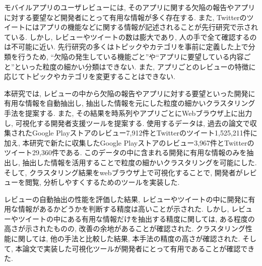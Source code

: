 
モバイルアプリのユーザレビューには, そのアプリに関する欠陥の報告やアプリに対する要望など開発者にとって有用な情報が多く存在する. また, Twitterのツイートにはアプリの機能などに関する情報が記述されることが先行研究で示されている. しかし, レビューやツイートの数は膨大であり, 人の手で全て確認するのは不可能に近い. 
先行研究の多くはトピックやカテゴリを事前に定義した上で分類を行うため, ``欠陥の発生している機能ごと''や``アプリに要望している内容ごと''といった粒度の細かい分類はできない. また, アプリごとのレビューの特徴に応じてトピックやカテゴリを変更することはできない. 

本研究では, レビューの中から欠陥の報告やアプリに対する要望といった開発に有用な情報を自動抽出し, 抽出した情報を元にした粒度の細かいクラスタリング手法を提案する. また, その結果を時系列やアプリごとにWebブラウザ上に出力し, 可視化する開発者支援ツールを提案する.
使用するデータは, 過去の論文で収集されたGoogle Playストアのレビュー7,912件とTwitterのツイート1,525,211件に加え, 本研究で新たに収集したGoogle Playストアのレビュー3,967件とTwitterのツイート29,360件である. このデータの中に含まれる開発に有用な情報のみを抽出し, 抽出した情報を活用することで粒度の細かいクラスタリングを可能にした. 
そして, クラスタリング結果をwebブラウザ上で可視化することで, 開発者がレビューを閲覧, 分析しやすくするためのツールを実装した. 

レビューの自動抽出の性能を評価した結果, レビューやツイートの中に開発に有用な情報があるかどうかを判断する精度は高いことが示された. 
しかし, レビューやツイートの中にある有用な情報だけを抽出する精度に関しては, ある程度の高さが示されたものの, 改善の余地があることが確認された. 
クラスタリング性能に関しては, 他の手法と比較した結果, 本手法の精度の高さが確認された. 
そして, 本論文で実装した可視化ツールが開発者にとって有用であることが確認できた. 
